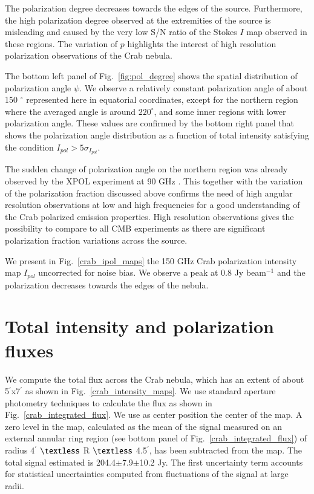 \documentclass[twocolumn,traditabstract]{aa}
\begin{document}
The polarization degree decreases towards the edges of the
source. Furthermore, the high polarization degree observed at the extremities of the source is misleading and caused by the very low S/N ratio of the Stokes $I$ map observed in these regions. The variation of $p$ highlights the interest of high resolution polarization
observations of the Crab nebula. 

The bottom left panel of Fig.~\ref{fig:pol_degree} shows the spatial distribution of polarization angle
$\psi$.  We observe a relatively constant polarization
angle of about 150 $^{\circ}$ represented here in equatorial coordinates, except
for the northern region where the averaged angle is around $220^{\circ}$, and
some inner regions with lower polarization angle.  These values are confirmed by
the bottom right panel that shows the polarization angle distribution as a
function of total intensity satisfying the condition $I_{pol} > 5\sigma_{I_{pol}}$.

The sudden change of polarization angle on the northern region was already
observed by the XPOL experiment at 90 GHz \citep{aumont2010}.  This together
with the variation of the polarization fraction discussed above confirms the
need of high angular resolution observations at low and high frequencies for a
good understanding of the Crab polarized emission properties.
High resolution observations gives the possibility to compare to all CMB experiments as there are significant polarization fraction variations across the source.

We present in Fig.~\ref{crab_ipol_maps} the 150 GHz Crab polarization intensity
map $I_{pol}$ uncorrected for noise bias. We observe a peak at 0.8 Jy beam$^{-1}$ and the polarization
decreases towards the edges of the nebula.

\section{Total intensity and polarization fluxes}\label{sec:Polarization estimates in CMB experiments like beams}
We compute the total flux across the Crab nebula, which has an extent of about
5$^{\prime}$x7$^{\prime}$ as shown in Fig.~\ref{crab_intensity_maps}.  We use
standard aperture photometry techniques to calculate the flux as shown in
Fig.~\ref{crab_integrated_flux}. We use as center position the center of the
map. A zero level in the map, calculated as the mean of the signal measured on
an external annular ring region (see bottom panel of
Fig.~\ref{crab_integrated_flux}) of radius 4$^\prime$ $\textless$ R $\textless$
4.5$^\prime$, has been subtracted from the map. The total signal estimated is
204.4$\pm$7.9$\pm$10.2 Jy. The first uncertainty term accounts for statistical
uncertainties computed from fluctuations of the signal at large radii.
\end{document}
